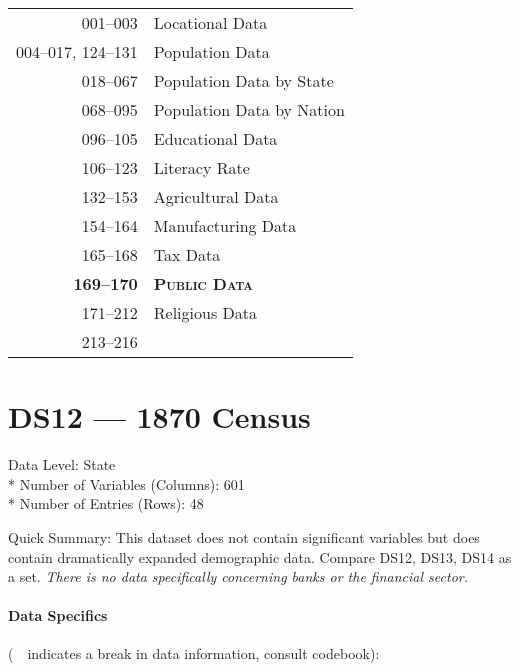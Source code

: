 ﻿\documentclass[12pt]{report}
\begin{document}
	\begin{tabular}{r|l}
		001--003 & Locational Data\\
		004--017, 124--131 & Population Data\\
		018--067 & Population Data by State\\
		068--095 & Population Data by Nation\\
		096--105 & Educational Data\\
		106--123 & Literacy Rate\\
		132--153 & Agricultural Data\\
		154--164 & Manufacturing Data\\
		165--168 & Tax Data\\
		\textbf{169--170} & \textsc{\textbf{Public Data}}\\
		171--212 & Religious Data\\
		213--216 & \guillemotleft~\guillemotright\\
	\end{tabular}
	\newpage

\section{DS12 --- 1870 Census}
	Data Level: State\\*
	Number of Variables (Columns): 601\\*
	Number of Entries (Rows): 48
	\vspace{1.5em}
	
	\noindent Quick Summary: This dataset does not contain significant variables but does contain dramatically expanded demographic data. Compare DS12, DS13, DS14 as a set. \textit{There is no data specifically concerning banks or the financial sector.}
	
	\paragraph{Data Specifics} (\guillemotleft~\guillemotright~indicates a break in data information, consult codebook):
	\vspace{1em}
	
\end{document}
